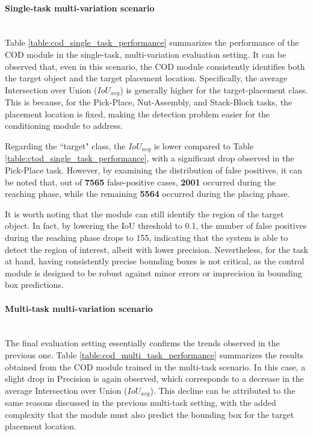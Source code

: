 
\paragraph*{Single-task multi-variation scenario}\mbox{}\\
Table \ref{table:cod_single_task_performance} summarizes the performance of the COD module in the single-task, multi-variation evaluation setting. It can be observed that, even in this scenario, the COD module consistently identifies both the target object and the target placement location. Specifically, the average Intersection over Union ($IoU_{avg}$) is generally higher for the target-placement class. This is because, for the Pick-Place, Nut-Assembly, and Stack-Block tasks, the placement location is fixed, making the detection problem easier for the conditioning module to address. 

Regarding the ``target" class, the $IoU_{avg}$ is lower compared to Table \ref{table:ctod_single_task_performance}, with a significant drop observed in the Pick-Place task. However, by examining the distribution of false positives, it can be noted that, out of \textbf{7565} false-positive cases, \textbf{2001} occurred during the reaching phase, while the remaining \textbf{5564} occurred during the placing phase. 

It is worth noting that the module can still identify the region of the target object. In fact, by lowering the IoU threshold to 0.1, the number of false positives during the reaching phase drops to 155, indicating that the system is able to detect the region of interest, albeit with lower precision. Nevertheless, for the task at hand, having consistently precise bounding boxes is not critical, as the control module is designed to be robust against minor errors or imprecision in bounding box predictions.


\paragraph*{Multi-task multi-variation scenario}\mbox{}\\
The final evaluation setting essentially confirms the trends observed in the previous one. Table \ref{table:cod_multi_task_performance} summarizes the results obtained from the COD module trained in the multi-task scenario. In this case, a slight drop in Precision is again observed, which corresponds to a decrease in the average Intersection over Union ($IoU_{avg}$). This decline can be attributed to the same reasons discussed in the previous multi-task setting, with the added complexity that the module must also predict the bounding box for the target placement location.


